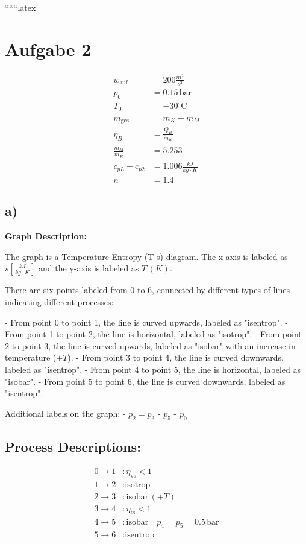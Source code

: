 
``````latex


\section*{Aufgabe 2}

\begin{align*}
w_{\text{auf}} &= 200 \frac{m^2}{s^2} \\
p_0 &= 0.15 \, \text{bar} \\
T_0 &= -30^\circ \text{C} \\
m_{\text{ges}} &= \dot{m}_K + \dot{m}_M \\
\eta_B &= \frac{Q_B}{\dot{m}_K} \\
\frac{\dot{m}_M}{\dot{m}_K} &= 5.253 \\
c_{pL} - c_{p2} &= 1.006 \frac{kJ}{kg \cdot K} \\
n &= 1.4
\end{align*}

\subsection*{a)}

\textbf{Graph Description:}

The graph is a Temperature-Entropy (T-s) diagram. The x-axis is labeled as \( s \left[ \frac{kJ}{kg \cdot K} \right] \) and the y-axis is labeled as \( T \, (K) \).

There are six points labeled from 0 to 6, connected by different types of lines indicating different processes:

- From point 0 to point 1, the line is curved upwards, labeled as "isentrop".
- From point 1 to point 2, the line is horizontal, labeled as "isotrop".
- From point 2 to point 3, the line is curved upwards, labeled as "isobar" with an increase in temperature (\(+T\)).
- From point 3 to point 4, the line is curved downwards, labeled as "isentrop".
- From point 4 to point 5, the line is horizontal, labeled as "isobar".
- From point 5 to point 6, the line is curved downwards, labeled as "isentrop".

Additional labels on the graph:
- \( p_2 = p_3 \)
- \( p_5 \)
- \( p_0 \)

\subsection*{Process Descriptions:}

\begin{align*}
0 \rightarrow 1 &: \eta_{\text{vs}} < 1 \\
1 \rightarrow 2 &: \text{isotrop} \\
2 \rightarrow 3 &: \text{isobar} \, (+T) \\
3 \rightarrow 4 &: \eta_{\text{ts}} < 1 \\
4 \rightarrow 5 &: \text{isobar} \quad p_4 = p_5 = 0.5 \, \text{bar} \\
5 \rightarrow 6 &: \text{isentrop}
\end{align*}

